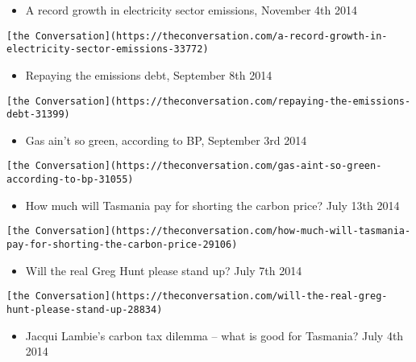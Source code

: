 \documentclass[
]{article}
\providecommand{\tightlist}{%
  \setlength{\itemsep}{0pt}\setlength{\parskip}{0pt}}
\begin{document}
\begin{itemize}
\tightlist
\item
  A record growth in electricity sector emissions, November 4th 2014
\end{itemize}

\begin{verbatim}
[the Conversation](https://theconversation.com/a-record-growth-in-electricity-sector-emissions-33772)
\end{verbatim}

\begin{itemize}
\tightlist
\item
  Repaying the emissions debt, September 8th 2014
\end{itemize}

\begin{verbatim}
[the Conversation](https://theconversation.com/repaying-the-emissions-debt-31399)
\end{verbatim}

\begin{itemize}
\tightlist
\item
  Gas ain't so green, according to BP, September 3rd 2014
\end{itemize}

\begin{verbatim}
[the Conversation](https://theconversation.com/gas-aint-so-green-according-to-bp-31055)
\end{verbatim}

\begin{itemize}
\tightlist
\item
  How much will Tasmania pay for shorting the carbon price? July 13th
  2014
\end{itemize}

\begin{verbatim}
[the Conversation](https://theconversation.com/how-much-will-tasmania-pay-for-shorting-the-carbon-price-29106)
\end{verbatim}

\begin{itemize}
\tightlist
\item
  Will the real Greg Hunt please stand up? July 7th 2014
\end{itemize}

\begin{verbatim}
[the Conversation](https://theconversation.com/will-the-real-greg-hunt-please-stand-up-28834)
\end{verbatim}

\begin{itemize}
\tightlist
\item
  Jacqui Lambie's carbon tax dilemma -- what is good for Tasmania? July
  4th 2014
\end{itemize}
\end{document}
